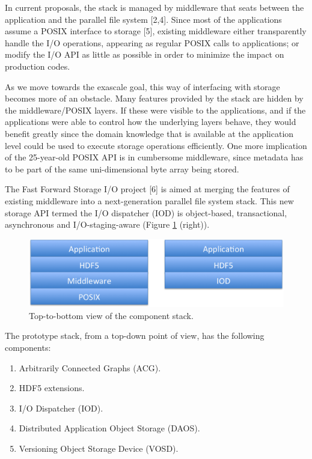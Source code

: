 \documentclass[conference]{IEEEtran}
\begin{document}
In current proposals, the stack is managed by middleware that seats
between the application and the parallel file system {[}2,4{]}. Since
most of the applications assume a POSIX interface to storage {[}5{]},
existing middleware either transparently handle the I/O operations,
appearing as regular POSIX calls to applications; or modify the I/O API
as little as possible in order to minimize the impact on production
codes.

As we move towards the exascale goal, this way of interfacing with
storage becomes more of an obstacle. Many features provided by the stack
are hidden by the middleware/POSIX layers. If these were visible to the
applications, and if the applications were able to control how the
underlying layers behave, they would benefit greatly since the domain
knowledge that is available at the application level could be used to
execute storage operations efficiently. One more implication of the
25-year-old POSIX API is in cumbersome middleware, since metadata has to
be part of the same uni-dimensional byte array being stored.

The Fast Forward Storage I/O project {[}6{]} is aimed at merging the
features of existing middleware into a next-generation parallel file
system stack. This new storage API termed the I/O dispatcher (IOD) is
object-based, transactional, asynchronous and I/O-staging-aware (Figure
\ref{exa-stack} (right)).

\begin{figure}[htbp]
\centering
\includegraphics[scale=0.30]{images/exa-stack.png}
\caption{Top-to-bottom view of the component stack. \label{exa-stack}}
\end{figure}

The prototype stack, from a top-down point of view, has the following
components:

\begin{enumerate}
\def\labelenumi{\arabic{enumi}.}
\itemsep1pt\parskip0pt
\item
  Arbitrarily Connected Graphs (ACG).
\item
  HDF5 extensions.
\item
  I/O Dispatcher (IOD).
\item
  Distributed Application Object Storage (DAOS).
\item
  Versioning Object Storage Device (VOSD).
\end{enumerate}
\end{document}
